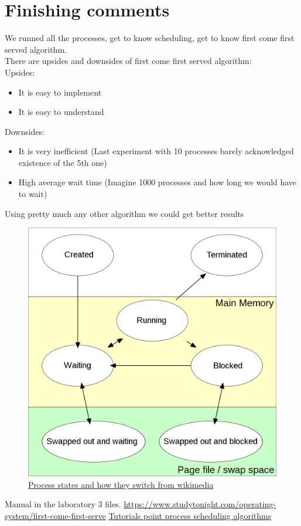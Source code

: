 \documentclass{article}
\begin{document}
\section{Finishing comments}
We runned all the processes, get to know scheduling, get to know first come
first served algorithm. \\
There are upsides and downsides of first come first served algorithm:
\\
Upsides:
\begin{itemize}
	\item It is easy to implement
	\item It is easy to understand
\end{itemize}
Downsides:
\begin{itemize}
	\item It is very inefficient (Last experiment with 10 processes barely
		acknowledged existence of the 5th one)
	\item High average wait time (Imagine 1000 processes and how long we
		would have to wait)
\end{itemize}
Using pretty much any other algorithm we could get better results \cite{First
come first serve}
\begin{figure}[H]
	\caption{\href{https://commons.wikimedia.org/wiki/File:Process_states.svg}{Process
	states and how they switch from wikimedia}}
	\includegraphics[width=\textwidth]{procestates}
\end{figure}

\begin{thebibliography}{9}
	 Manual in the laboratory 3 files.
	\href{https://www.studytonight.com/operating-system/first-come-first-serve}{https://www.studytonight.com/operating-system/first-come-first-serve}
	\href{https://www.tutorialspoint.com/operating_system/os_process_scheduling_algorithms.htm}{Tutorials
	point process scheduling algorithms}
\end{thebibliography}
\end{document}
